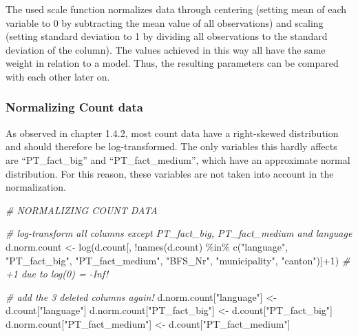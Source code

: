 \documentclass[
]{article}
\newenvironment{Shaded}{\begin{snugshade}}{\end{snugshade}}
\newcommand{\CommentTok}[1]{\textcolor[rgb]{0.56,0.35,0.01}{\textit{#1}}}
\newcommand{\DecValTok}[1]{\textcolor[rgb]{0.00,0.00,0.81}{#1}}
\newcommand{\FunctionTok}[1]{\textcolor[rgb]{0.00,0.00,0.00}{#1}}
\newcommand{\NormalTok}[1]{#1}
\newcommand{\OtherTok}[1]{\textcolor[rgb]{0.56,0.35,0.01}{#1}}
\newcommand{\SpecialCharTok}[1]{\textcolor[rgb]{0.00,0.00,0.00}{#1}}
\newcommand{\StringTok}[1]{\textcolor[rgb]{0.31,0.60,0.02}{#1}}
\begin{document}
The used scale function normalizes data through centering (setting mean
of each variable to 0 by subtracting the mean value of all observations)
and scaling (setting standard deviation to 1 by dividing all
observations to the standard deviation of the column). The values
achieved in this way all have the same weight in relation to a model.
Thus, the resulting parameters can be compared with each other later on.

\hypertarget{normalizing-count-data}{%
\subsubsection{Normalizing Count data}\label{normalizing-count-data}}

As observed in chapter 1.4.2, most count data have a right-skewed
distribution and should therefore be log-transformed. The only variables
this hardly affects are ``PT\_fact\_big'' and ``PT\_fact\_medium'',
which have an approximate normal distribution. For this reason, these
variables are not taken into account in the normalization.

\begin{Shaded}
\begin{Highlighting}[]
\CommentTok{\# NORMALIZING COUNT DATA}

\CommentTok{\# log{-}transform all columns except PT\_fact\_big, PT\_fact\_medium and language}
\NormalTok{d.norm.count }\OtherTok{\textless{}{-}} \FunctionTok{log}\NormalTok{(d.count[, }\SpecialCharTok{!}\FunctionTok{names}\NormalTok{(d.count) }
                            \SpecialCharTok{\%in\%} \FunctionTok{c}\NormalTok{(}\StringTok{"language"}\NormalTok{, }\StringTok{"PT\_fact\_big"}\NormalTok{, }\StringTok{"PT\_fact\_medium"}\NormalTok{,}
                                  \StringTok{"BFS\_Nr"}\NormalTok{, }\StringTok{"municipality"}\NormalTok{, }\StringTok{"canton"}\NormalTok{)]}\SpecialCharTok{+}\DecValTok{1}\NormalTok{) }
                                    \CommentTok{\# \textquotesingle{}+1\textquotesingle{} due to log(0) = {-}Inf!}

\CommentTok{\# add the 3 deleted columns again!}
\NormalTok{d.norm.count[}\StringTok{"language"}\NormalTok{] }\OtherTok{\textless{}{-}}\NormalTok{ d.count[}\StringTok{"language"}\NormalTok{]}
\NormalTok{d.norm.count[}\StringTok{"PT\_fact\_big"}\NormalTok{] }\OtherTok{\textless{}{-}}\NormalTok{ d.count[}\StringTok{"PT\_fact\_big"}\NormalTok{]}
\NormalTok{d.norm.count[}\StringTok{"PT\_fact\_medium"}\NormalTok{] }\OtherTok{\textless{}{-}}\NormalTok{ d.count[}\StringTok{"PT\_fact\_medium"}\NormalTok{]}
\end{Highlighting}
\end{Shaded}
\end{document}
